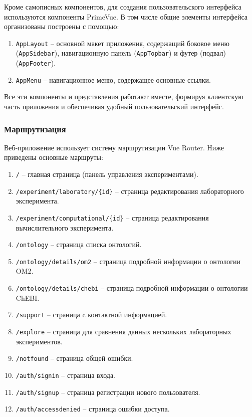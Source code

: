 Кроме самописных компонентов, для создания пользовательского интерфейса используются компоненты PrimeVue. В том числе общие элементы интерфейса организованы построены с помощью:

\begin{enumerate}
    \item \texttt{AppLayout} -- основной макет приложения, содержащий боковое меню (\texttt{AppSidebar}), навигационную панель (\texttt{AppTopbar}) и футер (подвал) (\texttt{AppFooter}).
    \item \texttt{AppMenu} -- навигационное меню, содержащее основные ссылки.
\end{enumerate}

Все эти компоненты и представления работают вместе, формируя клиентскую часть приложения и обеспечивая удобный пользовательский интерфейс.

\subsubsection{Маршрутизация}

Веб-приложение использует систему маршрутизации Vue Router. Ниже приведены основные маршруты:

\begin{enumerate}
    \item \texttt{/} -- главная страница (панель управления экспериментами).
    \item \texttt{/experiment/laboratory/\{id\}} -- страница редактирования лабораторного эксперимента.
    \item \texttt{/experiment/computational/\{id\}} -- страница редактирования вычислительного эксперимента.
    \item \texttt{/ontology} -- страница списка онтологий.
    \item \texttt{/ontology/details/om2} -- страница подробной информации о онтологии OM2.
    \item \texttt{/ontology/details/chebi} -- страница подробной информации о онтологии ChEBI.
    \item \texttt{/support} -- страница c контактной информацией.
    \item \texttt{/explore} -- страница для сравнения данных нескольких лабораторных экспериментов.
    \item \texttt{/notfound} -- страница общей ошибки.
    \item \texttt{/auth/signin} -- страница входа.
    \item \texttt{/auth/signup} -- страница регистрации нового пользователя.
    \item \texttt{/auth/accessdenied} -- страница ошибки доступа.
\end{enumerate}

